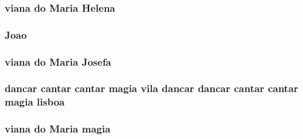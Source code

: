 \subsubsection[{\texorpdfstring{Helena}{Helena}}]{\setlength{\rightskip}{0pt plus 5cm}viana do {\bf Maria} Helena}\hypertarget{candidatos_8txt_a9d93dce88080548099a56cf093e4bba9}{}\label{candidatos_8txt_a9d93dce88080548099a56cf093e4bba9}
\subsubsection[{\texorpdfstring{Joao}{Joao}}]{ Joao}\hypertarget{candidatos_8txt_a6414eb73c2395148093f8baa9e202616}{}\label{candidatos_8txt_a6414eb73c2395148093f8baa9e202616}
\subsubsection[{\texorpdfstring{Josefa}{Josefa}}]{\setlength{\rightskip}{0pt plus 5cm}viana do {\bf Maria} Josefa}\hypertarget{candidatos_8txt_ae645720a55439c3bfd303f6840c137b1}{}\label{candidatos_8txt_ae645720a55439c3bfd303f6840c137b1}
\subsubsection[{\texorpdfstring{lisboa}{lisboa}}]{ {\bf dancar} {\bf cantar} {\bf cantar} {\bf magia} vila {\bf dancar} {\bf dancar} {\bf cantar} {\bf cantar} {\bf magia} lisboa}\hypertarget{candidatos_8txt_afcb0be523bb30dc71d43c136869e3683}{}\label{candidatos_8txt_afcb0be523bb30dc71d43c136869e3683}
\subsubsection[{\texorpdfstring{magia}{magia}}]{\setlength{\rightskip}{0pt plus 5cm}viana do {\bf Maria} magia}\hypertarget{candidatos_8txt_a59134b75acc1ed74b176c98faefd5e9b}{}\label{candidatos_8txt_a59134b75acc1ed74b176c98faefd5e9b}
